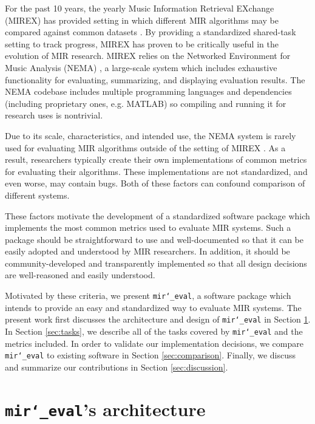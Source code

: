 \documentclass{article}
\def\mireval{\texttt{mir\char`_eval}}
\begin{document}
For the past 10 years, the yearly Music Information Retrieval EXchange (MIREX) has provided setting in which different MIR algorithms may be compared against common datasets \cite{downie2008music}.
By providing a standardized shared-task setting to track progress, MIREX has proven to be critically useful in the evolution of MIR research.
MIREX relies on the Networked Environment for Music Analysis (NEMA) \cite{west2010networked}, a large-scale system which includes exhaustive functionality for evaluating, summarizing, and displaying evaluation results.
The NEMA codebase includes multiple programming languages and dependencies (including proprietary ones, e.g. MATLAB) so compiling and running it for research uses is nontrivial.

Due to its scale, characteristics, and intended use, the NEMA system is rarely used for evaluating MIR algorithms outside of the setting of MIREX \cite{downie2008music}.
As a result, researchers typically create their own implementations of common metrics for evaluating their algorithms.
These implementations are not standardized, and even worse, may contain bugs.
Both of these factors can confound comparison of different systems.

These factors motivate the development of a standardized software package which implements the most common metrics used to evaluate MIR systems.
Such a package should be straightforward to use and well-documented so that it can be easily adopted and understood by MIR researchers.
In addition, it should be community-developed and transparently implemented so that all design decisions are well-reasoned and easily understood.

Motivated by these criteria, we present \mireval{}, a software package which intends to provide an easy and standardized way to evaluate MIR systems.
The present work first discusses the architecture and design of \mireval{} in Section \ref{sec:architecture}.
In Section \ref{sec:tasks}, we describe all of the tasks covered by \mireval{} and the metrics included.
In order to validate our implementation decisions, we compare \mireval{} to existing software in Section \ref{sec:comparison}.
Finally, we discuss and summarize our contributions in Section \ref{sec:discussion}.

\section{\mireval{}'s architecture}
\label{sec:architecture}
\end{document}
